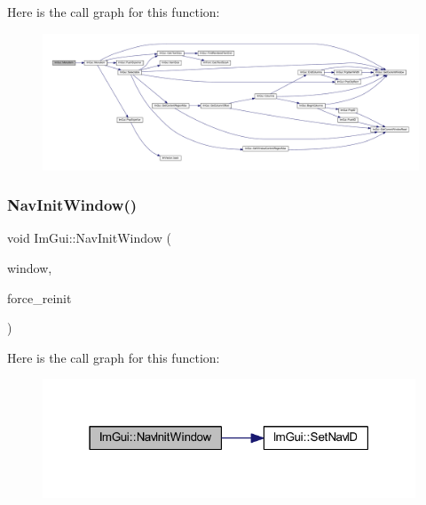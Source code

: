 Here is the call graph for this function\+:
\nopagebreak
\begin{figure}[H]
\begin{center}
\leavevmode
\includegraphics[width=350pt]{namespace_im_gui_a237e76bff3088f1c2622f4aebae2356e_cgraph}
\end{center}
\end{figure}
\mbox{\label{namespace_im_gui_ae46a79d836c4b223c7030ea432e3ec15}} 
\subsubsection{\texorpdfstring{Nav\+Init\+Window()}{NavInitWindow()}}
{\footnotesize\ttfamily void Im\+Gui\+::\+Nav\+Init\+Window (\begin{DoxyParamCaption}\item[{\mbox{\hyperlink{struct_im_gui_window}{Im\+Gui\+Window}} $\ast$}]{window,  }\item[{bool}]{force\+\_\+reinit }\end{DoxyParamCaption})}

Here is the call graph for this function\+:
\nopagebreak
\begin{figure}[H]
\begin{center}
\leavevmode
\includegraphics[width=315pt]{namespace_im_gui_ae46a79d836c4b223c7030ea432e3ec15_cgraph}
\end{center}
\end{figure}
\mbox{\label{namespace_im_gui_a3fab98556d11690efd4f7f2fde94968e}} 

